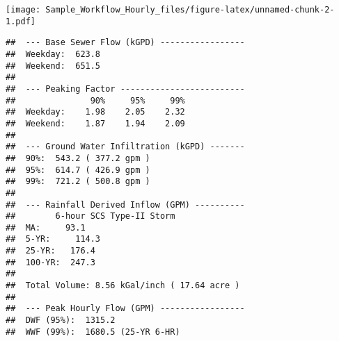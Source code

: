 \documentclass[]{article}
\title{}
\author{}
\date{}
\begin{document}

\texttt{[image: Sample\_Workflow\_Hourly\_files/figure-latex/unnamed-chunk-2-1.pdf]}

\begin{verbatim}
##  --- Base Sewer Flow (kGPD) ----------------- 
##  Weekday:  623.8 
##  Weekend:  651.5 
##  
##  --- Peaking Factor ------------------------- 
##               90%     95%     99% 
##  Weekday:    1.98    2.05    2.32 
##  Weekend:    1.87    1.94    2.09 
##  
##  --- Ground Water Infiltration (kGPD) ------- 
##  90%:  543.2 ( 377.2 gpm ) 
##  95%:  614.7 ( 426.9 gpm ) 
##  99%:  721.2 ( 500.8 gpm ) 
##  
##  --- Rainfall Derived Inflow (GPM) ---------- 
##        6-hour SCS Type-II Storm 
##  MA:     93.1 
##  5-YR:     114.3 
##  25-YR:   176.4 
##  100-YR:  247.3 
##  
##  Total Volume: 8.56 kGal/inch ( 17.64 acre ) 
##  
##  --- Peak Hourly Flow (GPM) ----------------- 
##  DWF (95%):  1315.2 
##  WWF (99%):  1680.5 (25-YR 6-HR)
\end{verbatim}
\end{document}

